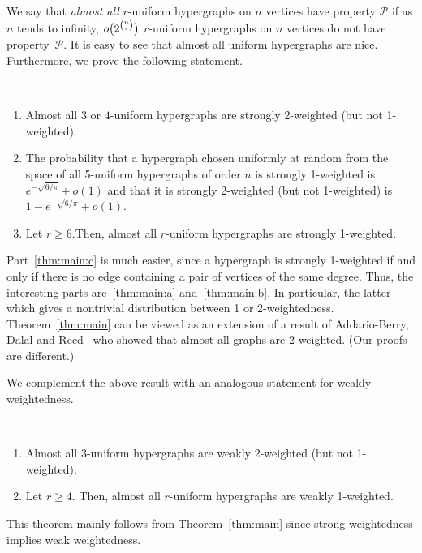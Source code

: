\documentclass[12pt,reqno]{amsart}
\begin{document}
We say that \emph{almost all} $r$-uniform hypergraphs on $n$ vertices have property $\mathcal{P}$ if as $n$ tends to infinity, $o\big{(}2^{\binom{n}{r}}\big{)}$ $r$-uniform hypergraphs on $n$ vertices do not have property~$\mathcal{P}$. It is easy to see that almost all uniform hypergraphs are nice. Furthermore, we prove the following statement.

\begin{theorem}\label{thm:main}\ \\[-15pt]
\begin{enumerate}[label=(\roman*)]
\item\label{thm:main:a} Almost all $3$ or $4$-uniform hypergraphs are strongly 2-weighted (but not 1-weigh\-ted). 
\item\label{thm:main:b} The probability that a hypergraph chosen uniformly at random from the space of all 5-uniform hypergraphs of order $n$ is strongly 1-weighted is $e^{-\sqrt{6/\pi}}+o(1)$ and that it is strongly 2-weighted (but not 1-weighted) is $1-e^{-\sqrt{6/\pi}}+o(1)$.
\item\label{thm:main:c} Let $r\ge 6$.Then, almost all $r$-uniform hypergraphs are strongly 1-weighted.
\end{enumerate}
\end{theorem}
Part~\ref{thm:main:c} is much easier, since a hypergraph is strongly 1-weighted if and only if there is no edge containing a pair of vertices of the same degree. Thus, the interesting parts are~\ref{thm:main:a} and~\ref{thm:main:b}. In particular, the latter which gives a nontrivial distribution between 1 or 2-weightedness. Theorem~\ref{thm:main} can be viewed as an extension of a result of Addario-Berry, Dalal and Reed~\cite{Gnp} who showed that almost all graphs are 2-weighted. (Our proofs are different.)

We complement the above result with an analogous statement for weakly weightedness. 
\begin{theorem}\label{thm:main2}\ \\[-15pt]
\begin{enumerate}[label=(\roman*)]
\item\label{thm:main2:a} Almost all $3$-uniform hypergraphs are weakly 2-weighted (but not 1-weighted). 
\item\label{thm:main2:b} Let $r\ge 4$. Then, almost all $r$-uniform hypergraphs are weakly 1-weighted.
\end{enumerate}
\end{theorem}
This theorem mainly follows from Theorem~\ref{thm:main} since strong weightedness implies weak weightedness. 
\end{document}
